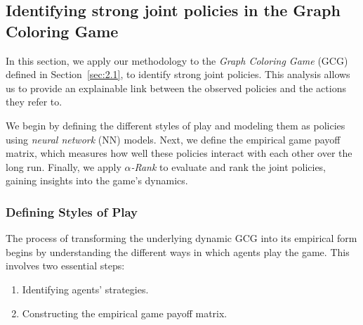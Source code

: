 \subsection{Identifying strong joint policies in the Graph Coloring Game}

    In this section, we apply our methodology to the \emph{Graph Coloring Game} (GCG) defined in Section~\ref{sec:2.1}, to identify strong joint policies. This analysis allows us to provide an explainable link between the observed policies and the actions they refer to.\tinydouble

    \noindent
    We begin by defining the different styles of play and modeling them as policies using \emph{neural network} (NN) models. Next, we define the empirical game payoff matrix, which measures how well these policies interact with each other over the long run. Finally, we apply \emph{$\alpha$-Rank} to evaluate and rank the joint policies, gaining insights into the game's dynamics.

    \subsubsection{Defining Styles of Play}
    \label{sec:5.1}

        The process of transforming the underlying dynamic GCG into its empirical form begins by understanding the different ways in which agents play the game. This involves two essential steps:
        \begin{enumerate}
            \item Identifying agents' strategies.
            \item Constructing the empirical game payoff matrix.
        \end{enumerate}

